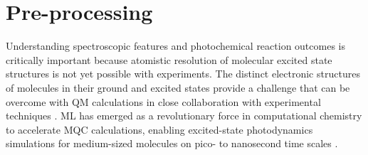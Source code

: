 \documentclass[9pt,bestpractices]{livecoms}
\begin{document}





\section{Pre-processing}
\label{sec:preprocessing}

Understanding spectroscopic features and photochemical reaction outcomes is critically important because atomistic resolution of molecular excited state structures is not yet possible with experiments. The distinct electronic structures of molecules in their ground and excited states provide a challenge that can be overcome with QM calculations in close collaboration with experimental techniques \cite{RN107}. ML has emerged as a revolutionary force in computational chemistry to accelerate MQC calculations, enabling excited-state photodynamics simulations for medium-sized molecules on pico- to nanosecond time scales \cite{RN140, RN132}.
\end{document}
